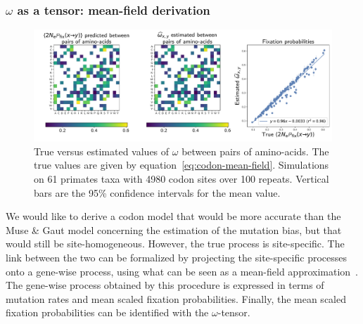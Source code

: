 \documentclass{article}
\begin{document}
\subsubsection{\texorpdfstring{$\omega$}{ω} as a tensor: mean-field derivation}

\begin{figure}[!htb]
 \centering
 \includegraphics[width=\linewidth, page=1]{inference_simulations/omega_pair_MF}
 \caption[Estimation of fixation probability]{
  True versus estimated values of $\omega$ between pairs of amino-acids.
  The true values are given by equation~\ref{eq:codon-mean-field}.
  Simulations on 61 primates taxa with 4980 codon sites over 100 repeats.
Vertical bars are the 95\% confidence intervals for the mean value.
 }
 \label{fig:omega-inference}
\end{figure}

We would like to derive a codon model that would be more accurate than the Muse \& Gaut model concerning the estimation of the mutation bias, but that would still be site-homogeneous.
However, the true process is site-specific.
The link between the two can be formalized by projecting the site-specific processes onto a gene-wise process, using what can be seen as a mean-field approximation~\citep{Goldstein2016}.
The gene-wise process obtained by this procedure is expressed in terms of mutation rates and mean scaled fixation probabilities.
Finally, the mean scaled fixation probabilities can be identified with the $\omega$-tensor.
\end{document}
